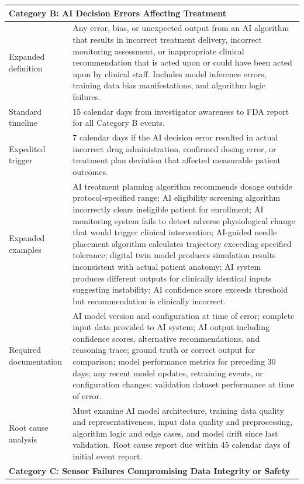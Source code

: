 \begin{table}[H]
\begin{tabularx}{\textwidth}{l X}
\midrule
\multicolumn{2}{l}{\textbf{Category B: AI Decision Errors Affecting Treatment}} \\
\midrule
Expanded definition & Any error, bias, or unexpected output from an AI algorithm that results in incorrect treatment delivery, incorrect monitoring assessment, or inappropriate clinical recommendation that is acted upon or could have been acted upon by clinical staff. Includes model inference errors, training data bias manifestations, and algorithm logic failures. \\
\midrule
Standard timeline & 15 calendar days from investigator awareness to FDA report for all Category B events. \\
\midrule
Expedited trigger & 7 calendar days if the AI decision error resulted in actual incorrect drug administration, confirmed dosing error, or treatment plan deviation that affected measurable patient outcomes. \\
\midrule
Expanded examples & AI treatment planning algorithm recommends dosage outside protocol-specified range; AI eligibility screening algorithm incorrectly clears ineligible patient for enrollment; AI monitoring system fails to detect adverse physiological change that would trigger clinical intervention; AI-guided needle placement algorithm calculates trajectory exceeding specified tolerance; digital twin model produces simulation results inconsistent with actual patient anatomy; AI system produces different outputs for clinically identical inputs suggesting instability; AI confidence score exceeds threshold but recommendation is clinically incorrect. \\
\midrule
Required documentation & AI model version and configuration at time of error; complete input data provided to AI system; AI output including confidence scores, alternative recommendations, and reasoning trace; ground truth or correct output for comparison; model performance metrics for preceding 30 days; any recent model updates, retraining events, or configuration changes; validation dataset performance at time of error. \\
\midrule
Root cause analysis & Must examine AI model architecture, training data quality and representativeness, input data quality and preprocessing, algorithm logic and edge cases, and model drift since last validation. Root cause report due within 45 calendar days of initial event report. \\
\midrule
\multicolumn{2}{l}{\textbf{Category C: Sensor Failures Compromising Data Integrity or Safety}} \\

\end{tabularx}
\end{table}
